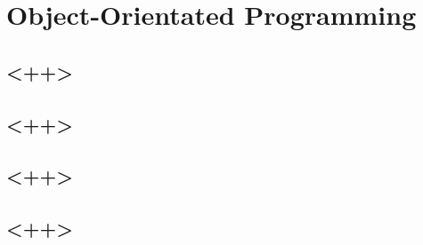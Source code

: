 \chapter{Object-Orientated Programming}

\section{<++>}

\section{<++>}

\section{<++>}

\section{<++>}

